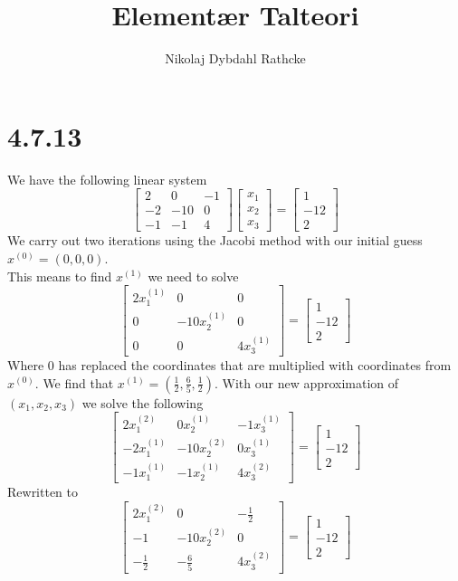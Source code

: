 \documentclass[12pt]{article}
\title{Elementær Talteori}
\author{Nikolaj Dybdahl Rathcke}
\begin{document}
\section*{4.7.13}
We have the following linear system
$$
\begin{bmatrix}
2 & 0 & -1 \\
-2 & -10 & 0 \\
-1 & -1 & 4
\end{bmatrix}
\begin{bmatrix}
x_1 \\
x_2 \\
x_3
\end{bmatrix}
=
\begin{bmatrix}
1 \\
-12 \\
2
\end{bmatrix}
$$
We carry out two iterations using the Jacobi method with our initial guess $x^{(0)}=(0,0,0)$.\\
This means to find $x^{(1)}$ we need to solve
$$
\begin{bmatrix}
2x_1^{(1)} & 0 & 0 \\
0 & -10x_2^{(1)} & 0 \\
0 & 0 & 4x_3^{(1)}
\end{bmatrix}
=
\begin{bmatrix}
1 \\
-12 \\
2
\end{bmatrix}
$$
Where $0$ has replaced the coordinates that are multiplied with coordinates from $x^{(0)}$. We find that $x^{(1)}=(\frac{1}{2},\frac{6}{5},\frac{1}{2})$. With our new approximation of $(x_1,x_2,x_3)$ we solve the following
$$
\begin{bmatrix}
2x_1^{(2)} & 0x_2^{(1)} & -1x_3^{(1)} \\
-2x_1^{(1)} & -10x_2^{(2)} & 0x_3^{(1)} \\
-1x_1^{(1)} & -1x_2^{(1)} & 4x_3^{(2)}
\end{bmatrix}
=
\begin{bmatrix}
1 \\
-12 \\
2
\end{bmatrix}
$$
Rewritten to
$$
\begin{bmatrix}
2x_1^{(2)} & 0 & -\frac{1}{2} \\
-1 & -10x_2^{(2)} & 0 \\
-\frac{1}{2} & -\frac{6}{5} & 4x_3^{(2)}
\end{bmatrix}
=
\begin{bmatrix}
1 \\
-12 \\
2
\end{bmatrix}
$$
\end{document}
